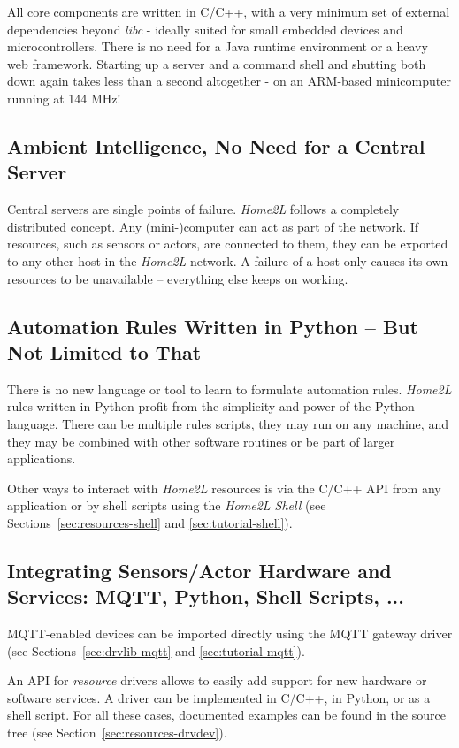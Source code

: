 \documentclass[12pt,english,parskip=half,headheight=19pt]{scrreprt}
\begin{document}
All core components are written in C/C++, with a very minimum set of external dependencies beyond \textit{libc} - ideally suited for small embedded devices and microcontrollers. There is no need for a Java runtime environment or a heavy web framework. Starting up a server and a command shell and shutting both down again takes less than a second altogether - on an ARM-based minicomputer running at 144 MHz!


\subsection*{Ambient Intelligence, No Need for a Central Server}

Central servers are single points of failure. \textit{Home2L} follows a completely distributed concept. Any (mini-)computer can act as part of the network. If resources, such as sensors or actors, are connected to them, they can be exported to any other host in the \textit{Home2L} network. A failure of a host only causes its own resources to be unavailable -- everything else keeps on working.


\subsection*{Automation Rules Written in Python -- But Not Limited to That}

There is no new language or tool to learn to formulate automation rules. \textit{Home2L} rules written in Python profit from the simplicity and power of the Python language. There can be multiple rules scripts, they may run on any machine, and they may be combined with other software routines or be part of larger applications.

Other ways to interact with \textit{Home2L} resources is via the C/C++ API from any application or by shell scripts using the \textit{Home2L Shell} (see Sections~\ref{sec:resources-shell} and \ref{sec:tutorial-shell}).


\subsection*{Integrating Sensors/Actor Hardware and Services: MQTT, Python, Shell Scripts, ...}

MQTT-enabled devices can be imported directly using the MQTT gateway driver (see Sections~\ref{sec:drvlib-mqtt} and \ref{sec:tutorial-mqtt}).

An API for \textit{resource} drivers allows to easily add support for new hardware or software services. A driver can be implemented in C/C++, in Python, or as a shell script. For all these cases, documented examples can be found in the source tree (see Section~\ref{sec:resources-drvdev}).
\end{document}
